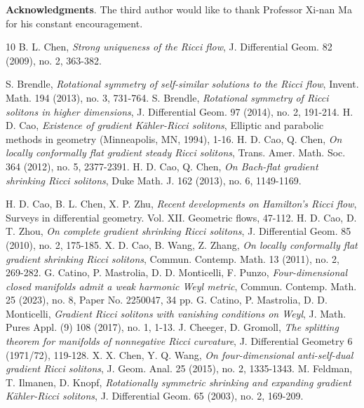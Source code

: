 \documentclass[a4, 12pt]{amsart}
\theoremstyle{plain}
\begin{document}
{\bf Acknowledgments}.
The third author would like to thank Professor Xi-nan Ma for his constant encouragement.

\begin{thebibliography}{10}
	B. L. Chen, {\em Strong uniqueness of the Ricci flow}, J. Differential Geom. 82 (2009), no. 2, 363-382.

	S. Brendle, {\em  Rotational symmetry of self-similar solutions to the Ricci flow}, Invent. Math. 194 (2013), no. 3, 731-764.
	S. Brendle, {\em Rotational symmetry of Ricci solitons in higher dimensions}, J. Differential Geom. 97 (2014), no. 2, 191-214.
	H. D. Cao, {\em Existence of gradient K\"ahler-Ricci solitons}, Elliptic and parabolic methods in geometry (Minneapolis, MN, 1994), 1-16.
	H. D. Cao, Q. Chen, {\em On locally conformally flat gradient steady Ricci solitons}, Trans. Amer. Math. Soc. 364 (2012), no. 5, 2377-2391.
	H. D. Cao, Q. Chen,     {\em On Bach-flat gradient shrinking Ricci solitons}, Duke Math. J. 162 (2013), no. 6, 1149-1169.
	
	H. D. Cao, B. L. Chen, X. P. Zhu, {\em Recent developments on Hamilton's Ricci flow}, Surveys in differential geometry. Vol. XII. Geometric flows, 47-112.
	H. D. Cao, D. T. Zhou, {\em On complete gradient shrinking Ricci solitons}, J. Differential Geom. 85 (2010), no. 2, 175-185.
	X. D. Cao, B. Wang, Z. Zhang, {\em On locally conformally flat gradient shrinking Ricci solitons}, Commun. Contemp. Math. 13 (2011), no. 2, 269-282.
	G. Catino, P. Mastrolia, D. D. Monticelli, F.  Punzo,  {\em Four-dimensional closed manifolds admit a weak harmonic Weyl metric}, Commun. Contemp. Math. 25 (2023), no. 8, Paper No. 2250047, 34 pp.
	G. Catino, P. Mastrolia,  D. D. Monticelli, {\em Gradient Ricci solitons with vanishing conditions on Weyl}, J. Math. Pures Appl. (9) 108 (2017), no. 1, 1-13.
	J. Cheeger, D. Gromoll, {\em The splitting theorem for manifolds of nonnegative Ricci curvature}, J. Differential Geometry 6 (1971/72), 119-128.
	X. X. Chen, Y. Q. Wang, {\em On four-dimensional anti-self-dual gradient Ricci solitons}, J. Geom. Anal. 25 (2015), no. 2, 1335-1343.
	M. Feldman, T. Ilmanen, D. Knopf, {\em Rotationally symmetric shrinking and expanding gradient K\"ahler-Ricci solitons}, J. Differential Geom. 65 (2003), no. 2, 169-209.
	

\end{thebibliography}
\end{document}

